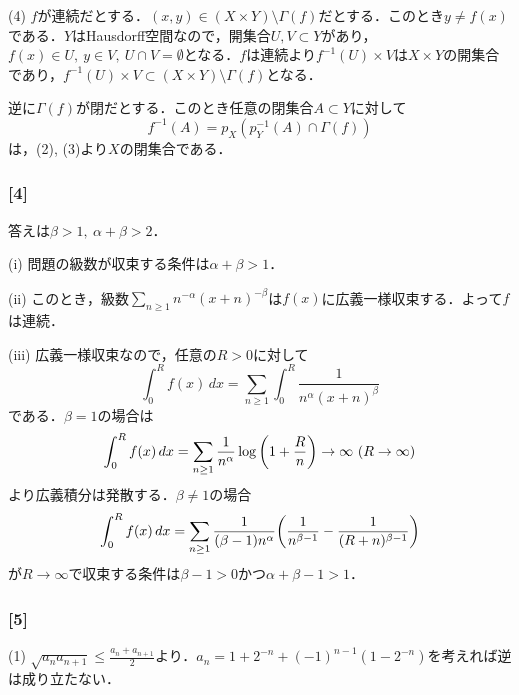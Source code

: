 \documentclass[a4j]{ltjsarticle}
\newcommand{\1}{\mathbbm{1}}
\numberwithin{equation}{section}
\theoremstyle{definition}
\begin{document}
(4) $f$が連続だとする．$(x,y)\in (X\times Y)\setminus \Gamma(f)$だとする．このとき$y\neq f(x)$である．$Y$はHausdorff空間なので，開集合$U,V\subset Y$があり，$f(x)\in U,\ y\in V,\ U\cap V=\emptyset$となる．$f$は連続より$f^{-1}(U)\times V$は$X\times Y$の開集合であり，$f^{-1}(U)\times V\subset (X\times Y)\setminus \Gamma(f)$となる．

逆に$\Gamma(f)$が閉だとする．このとき任意の閉集合$A\subset Y$に対して
\begin{equation}
    f^{-1}(A)=p_X(p_{Y}^{-1}(A)\cap \Gamma(f)) 
\end{equation}
は，(2), (3)より$X$の閉集合である．

\subsubsection*{[4]}
答えは$\beta>1,\ \alpha+\beta>2$．

(i) 問題の級数が収束する条件は$\alpha+\beta>1$．

(ii) このとき，級数$\sum_{n\geq 1}n^{-\alpha}(x+n)^{-\beta}$は$f(x)$に広義一様収束する．よって$f$は連続．

(iii) 広義一様収束なので，任意の$R>0$に対して
\begin{equation}
    \int_{0}^{R}f(x)\,dx=\sum_{n\geq 1}\int_{0}^{R}\frac{1}{n^{\alpha}(x+n)^{\beta}}
\end{equation}
である．$\beta=1$の場合は
\begin{equation}
    \int_{0}^{R}f(x)\,dx=\sum_{n\geq 1}\frac{1}{n^\alpha}\log\qty(1+\frac{R}{n})\to\infty\ (R\to\infty)
\end{equation}
より広義積分は発散する．$\beta\neq 1$の場合
\begin{equation}
    \int_{0}^{R}f(x)\,dx=\sum_{n\geq 1}\frac{1}{(\beta-1)n^{\alpha}}\qty(\frac{1}{n^{\beta-1}}-\frac{1}{(R+n)^{\beta-1}})
\end{equation}
が$R\to\infty$で収束する条件は$\beta-1>0$かつ$\alpha+\beta-1>1$．
\subsubsection*{[5]}
(1) $\sqrt{a_na_{n+1}}\leq \frac{a_n+a_{n+1}}{2}$より．$a_n=1+2^{-n}+(-1)^{n-1}(1-2^{-n})$を考えれば逆は成り立たない．
\end{document}
